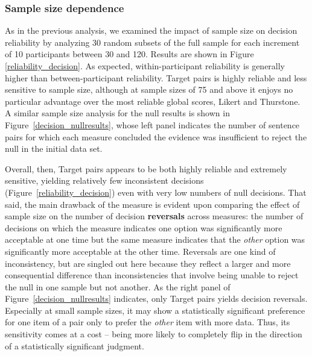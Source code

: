\documentclass[doc]{apa6}
\newcommand{\targchoice}{{\sc Target pairs}}
\newcommand{\thurstone}{{\sc Thurstone}}
\newcommand{\likert}{{\sc Likert}}
\newcommand{\initial}{{\sc initial}}
\begin{document}
\subsubsection{Sample size dependence}

As in the previous analysis, we examined the impact of sample size on decision reliability by analyzing 30 random subsets of the full sample for each increment of 10 participants between 30 and 120. Results are shown in Figure \ref{reliability_decision}. As expected, within-participant reliability is generally higher than between-participant reliability. \targchoice{} is highly reliable and less sensitive to sample size, although at sample sizes of 75 and above it enjoys no particular advantage over the most reliable global scores, \likert{} and \thurstone. A similar sample size analysis for the null results is shown in Figure~\ref{decision_nullresults}, whose left panel indicates the number of sentence pairs for which each measure concluded the evidence was insufficient to reject the null in the \initial{} data set.

Overall, then, \targchoice{} appears to be both highly reliable and extremely sensitive, yielding relatively few inconsistent decisions (Figure~\ref{reliability_decision}) even with very low numbers of null decisions. That said, the main drawback of the measure is evident upon comparing the effect of sample size on the number of decision {\bf reversals} across measures: the number of decisions on which the measure indicates one option was significantly more acceptable at one time but the same measure indicates that the {\it other} option was significantly more acceptable at the other time. Reversals are one kind of inconsistency, but are singled out here because they reflect a larger and more consequential difference than inconsistencies that involve being unable to reject the null in one sample but not another. As the right panel of Figure~\ref{decision_nullresults} indicates, only \targchoice{} yields decision reversals. Especially at small sample sizes, it may show a statistically significant preference for one item of a pair only to prefer the {\it other} item with more data. Thus, its sensitivity comes at a cost -- being more likely to completely flip in the direction of a statistically significant judgment.
\end{document}
